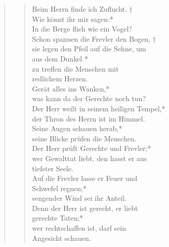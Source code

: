 



\begin{quote}
\begin{verse}


\smallskip
Beim Herrn finde ich Zuflucht. †\\
Wie könnt ihr mir sagen:*\\
In die Berge flieh wie ein Vogel?\\ \vin
Schon spannen die Frevler den Bogen, †\\ \vin
sie legen den Pfeil auf die Sehne, um \\ \vin aus dem Dunkel *\\ \vin
zu treffen die Menschen mit \\ \vin redlichem Herzen.\\
Gerät alles ins Wanken,*\\
was kann da der Gerechte noch tun?\\ \vin
Der Herr weilt in seinem heiligen Tempel,*\\ \vin
der Thron des Herrn ist im Himmel.\\
Seine Augen schauen herab,*\\
seine Blicke prüfen die Menschen.\\ \vin
Der Herr prüft Gerechte und Frevler;*\\ \vin
wer Gewalttat liebt, den hasst er aus \\ \vin tiefster Seele.\\
Auf die Frevler lasse er Feuer und \\ Schwefel regnen;*\\
sengender Wind sei ihr Anteil.\\ \vin
Denn der Herr ist gerecht, er liebt\\ \vin gerechte Taten;*\\ \vin
wer rechtschaffen ist, darf sein\\ \vin  Angesicht schauen.\\


\end{verse}




\begin{verse}


\smallskip


\end{verse}
\end{quote}
